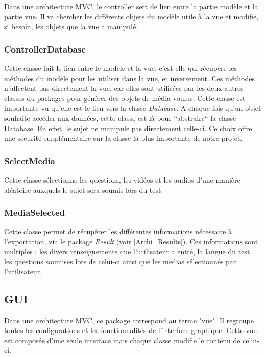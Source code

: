 Dans une architecture MVC, le controller sert de lien entre la partie modèle et la partie vue. Il va chercher les différents objets du modèle utile à la vue et modifie, si besoin, les objets que la vue a manipulé.

\subsubsection{ControllerDatabase}

Cette classe fait le lien entre le modèle et la vue, c'est elle qui récupère les méthodes du modèle pour les utiliser dans la vue, et inversement. Ces méthodes n'affectent pas directement la vue, car elles sont utilisées par les deux autres classes du packages pour générer des objets de média voulus.
Cette classe est importante vu qu'elle est le lien vers la classe \textit{Database}. A chaque fois qu'un objet souhaite accéder aux données, cette classe est là pour ``abstraire`` la classe Database. En effet, le sujet ne manipule pas directement celle-ci. Ce choix offre une sécurité supplémentaire sur la classe la plus importante de notre projet.

\subsubsection{SelectMedia}

Cette classe sélectionne les questions, les vidéos et les audios d'une manière aléatoire auxquels le sujet sera soumis lors du test.

\subsubsection{MediaSelected}

Cette classe permet de récupérer les différentes informations nécessaire à l'exportation, via le package \textit{Result} (voir \ref{Archi_Results}). Ces informations sont multiples : les divers renseignements que l'utilisateur a entré, la langue du test, les questions soumises lors de celui-ci ainsi que les medias sélectionnés par l'utilisateur.


\subsection{GUI}

Dans une architecture MVC, ce package correspond au terme "vue". Il regroupe toutes les configurations et les fonctionnalités de l'interface graphique. Cette vue est composée d'une seule interface mais chaque classe modifie le contenu de celui-ci.

